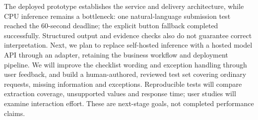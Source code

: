 \documentclass[10pt,letterpaper]{article}
\newcommand{\heading}[1]{\vspace{3pt}{\large\bfseries #1}\par\vspace{2pt}}
\begin{document}
\heading{Next steps: faster responses, smoother interaction and stronger evaluation}
The deployed prototype establishes the service and delivery architecture, while
CPU inference remains a bottleneck: one natural-language submission test reached
the 60-second deadline; the explicit button fallback completed successfully.
Structured output and evidence checks also do not guarantee correct interpretation.
Next, we plan to replace self-hosted inference with a hosted model API through an
adapter, retaining the business workflow and deployment pipeline. We will improve
the checklist wording and exception handling through user feedback, and build a
human-authored, reviewed test set covering ordinary requests, missing information
and exceptions. Reproducible tests will compare extraction coverage, unsupported
values and response time; user studies will examine interaction effort.
These are next-stage goals, not completed performance claims.
\label{report-end}
\end{document}
